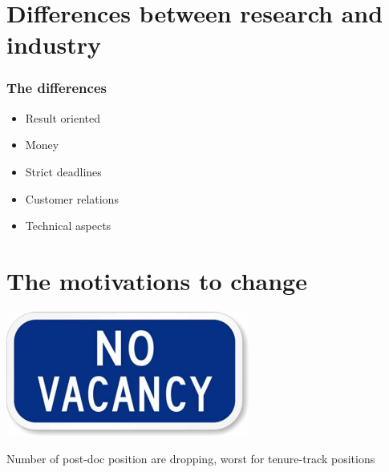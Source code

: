 \documentclass[]{beamer}
\begin{document}
\section[Differences]{Differences between research and industry}
\begin{frame}
\frametitle{The differences}
\begin{itemize}
\item Result oriented\pause
\item Money
\item Strict deadlines
\item Customer relations
\item Technical aspects
\end{itemize}
\end{frame}

\section[Motivations]{The motivations to change}
%

\begin{frame}
\centering
\includegraphics[width=0.6\textwidth]{No-Vacancy-Sign}

Number of post-doc position are dropping, worst for tenure-track positions
\end{frame}
\end{document}
